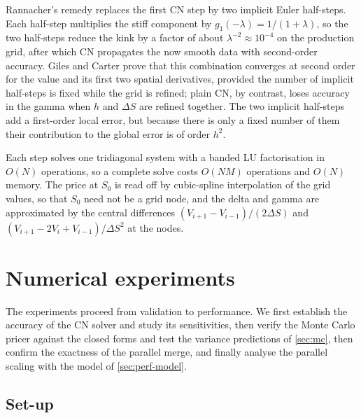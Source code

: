 \documentclass[11pt,a4paper]{article}
\begin{document}
Rannacher's remedy \citep{rannacher1984,giles2006} replaces the first CN step by two implicit Euler half-steps.
Each half-step multiplies the stiff component by $g_1(-\lambda) = 1/(1+\lambda)$, so the two half-steps reduce the kink by a factor of about $\lambda^{-2}\approx10^{-4}$ on the production grid, after which CN propagates the now smooth data with second-order accuracy.
Giles and Carter \citep{giles2006} prove that this combination converges at second order for the value and its first two spatial derivatives, provided the number of implicit half-steps is fixed while the grid is refined; plain CN, by contrast, loses accuracy in the gamma when $h$ and $\Delta S$ are refined together.
The two implicit half-steps add a first-order local error, but because there is only a fixed number of them their contribution to the global error is of order $h^2$.

Each step solves one tridiagonal system with a banded LU factorisation in $O(N)$ operations, so a complete solve costs $O(NM)$ operations and $O(N)$ memory.
The price at $S_0$ is read off by cubic-spline interpolation of the grid values, so that $S_0$ need not be a grid node, and the delta and gamma are approximated by the central differences $(V_{i+1}-V_{i-1})/(2\Delta S)$ and $(V_{i+1}-2V_i+V_{i-1})/\Delta S^2$ at the nodes.

\section{Numerical experiments}\label{sec:experiments}

The experiments proceed from validation to performance.
We first establish the accuracy of the CN solver and study its sensitivities, then verify the Monte Carlo pricer against the closed forms and test the variance predictions of \cref{sec:mc}, then confirm the exactness of the parallel merge, and finally analyse the parallel scaling with the model of \cref{sec:perf-model}.

\subsection{Set-up}\label{sec:setup}
\end{document}
